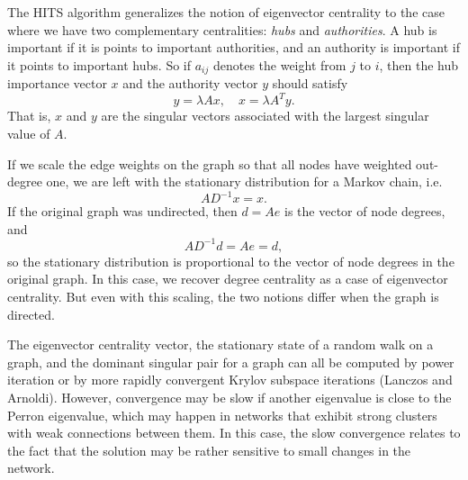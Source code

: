 \documentclass[12pt, leqno]{article} %
\begin{document}
The HITS algorithm generalizes the notion of eigenvector centrality to
the case where we have two complementary centralities: {\em hubs} and
{\em authorities}.  A hub is important if it is points to important
authorities, and an authority is important if it points to important
hubs.  So if $a_{ij}$ denotes the weight from $j$ to $i$, then the hub
importance vector $x$ and the authority vector $y$ should satisfy
\[
  y = \lambda Ax, \quad x = \lambda A^T y.
\]
That is, $x$ and $y$ are the singular vectors associated with the
largest singular value of $A$.

If we scale the edge weights on the graph so that all nodes have
weighted out-degree one, we are left with the stationary distribution
for a Markov chain, i.e.
\[
  AD^{-1} x = x.
\]
If the original graph was undirected, then $d = Ae$ is the vector of
node degrees, and
\[
  AD^{-1} d = Ae = d,
\]
so the stationary distribution is proportional to the vector of node
degrees in the original graph.  In this case, we recover degree
centrality as a case of eigenvector centrality.  But even with this
scaling, the two notions differ when the graph is directed.

The eigenvector centrality vector, the stationary state of a random
walk on a graph, and the dominant singular pair for a graph can all be
computed by power iteration or by more rapidly convergent
Krylov subspace iterations (Lanczos and Arnoldi).  However,
convergence may be slow if another eigenvalue is close to the Perron
eigenvalue, which may happen in networks that exhibit strong clusters
with weak connections between them.  In this case, the slow
convergence relates to the fact that the solution may be rather
sensitive to small changes in the network.
\end{document}
